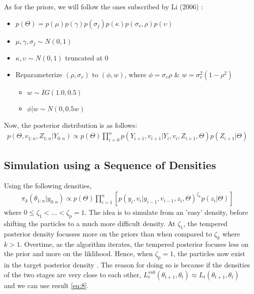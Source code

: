 \documentclass[12pt]{article}
\theoremstyle{definition}
\begin{document}
As for the priors, we will follow the ones subscribed by Li (2006) \citep{li2008bayesian}:
\begin{itemize}
\item $p(\Theta)=p(\mu)p(\gamma)p(\sigma_{j})p(\kappa)p(\sigma_v,\rho)p(\upsilon)$
\item $\mu,\gamma,\sigma_{j} \sim N(0,1)$
\item $\kappa,\upsilon \sim N(0,1)$ truncated at 0
\item Reparameterize $(\rho,\sigma_{v})$ to $(\phi,w)$, where $\phi = \sigma_{v} \rho$ \& $w = \sigma_{v}^{2}(1-\rho^{2})$
\begin{itemize}
\item $w \sim IG(1.0,0.5)$
\item $\phi | w \sim N(0,0.5w)$
\end{itemize}
\end{itemize}


\noindent Now, the posterior distribution is as follows:
\begin{equation}
\begin{aligned}
p(\Theta,v_{1:n},Z_{1:n}|Y_{0:n}) \propto p(\Theta) \prod_{i=0}^{n} p(Y_{i+1},v_{i+1}|Y_{i},v_{i},Z_{i+1},\Theta)p(Z_{i+1}|\Theta)
\end{aligned}
\end{equation}

\subsection{Simulation using a Sequence of Densities}
Using the following densities,
\begin{equation}
	\begin{aligned}
		\pi_{k}(\theta_{1:n}|y_{0:n}) \propto p(\Theta)\prod_{i=1}^{n}[p(y_{i},v_{i}|y_{i-1},v_{i-1},z_{i},\Theta)^{\zeta_{k}}p(z_{i}|\Theta)] 
	\end{aligned}
\end{equation}
where $0\leqslant\zeta_{1}<...<\zeta_{p}=1.$ 
\noindent The idea is to simulate from an 'easy' density, before shifting the particles to a much more difficult density. At $\zeta_{1}$, the tempered posterior density focusses more on the priors than when compared to $\zeta_{k}$ where $k>1$. Overtime, as the algorithm iterates, the tempered posterior focuses less on the prior and more on the liklihood. Hence, when $\zeta_{p}=1$, the particles now exist in the target posterior density \citep{jasra2011inference}. The reason for doing so is because if the densities of the two stages are very close to each other, $L^{sub}_{t}(\theta_{t+1},\theta_{t}) \approx L_{t}(\theta_{t+1},\theta_{t}) $ and we can use result \ref{eq:8}.
\end{document}
